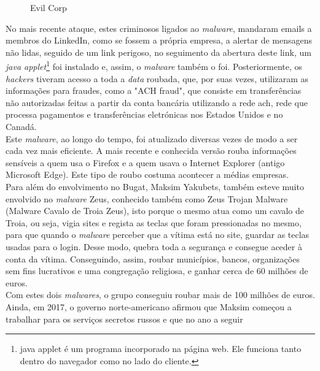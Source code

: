 \documentclass{report}
\begin{document}
\begin{figure}[h]
    \center
    \caption{Evil Corp}
    \label{evilcorp}
\end{figure}

No mais recente ataque, estes criminosos ligados ao \textit{malware}, mandaram emails a membros do LinkedIn, como se fossem a própria empresa, a alertar de mensagens não lidas, seguido de um link perigoso, no seguimento da abertura deste link, um \textit{java applet}\footnote{java applet é um programa incorporado na página web. Ele funciona tanto dentro do navegador como no lado do cliente.} foi instalado e, assim, o \textit{malware} também o foi. Posteriormente, os \textit{hackers} tiveram acesso a toda a \textit{data} roubada, que, por suas vezes, utilizaram as informações para fraudes, como a "ACH fraud", que consiste em transferências não autorizadas feitas a partir da conta bancária utilizando a rede \ac{ach}, rede que processa pagamentos e transferências eletrónicas nos Estados Unidos e no Canadá. \\ \indent Este \textit{malware}, ao longo do tempo, foi atualizado diversas vezes de modo a ser cada vez mais eficiente. A mais recente e conhecida versão rouba informações sensíveis a quem usa o Firefox e a quem usava o Internet Explorer (antigo Microsoft Edge). Este tipo de roubo costuma acontecer a médias empresas.\\ \indent Para além do envolvimento no Bugat, Maksim Yakubets, também esteve muito envolvido no \textit{malware} Zeus, conhecido também como Zeus Trojan Malware (Malware Cavalo de Troia Zeus), isto porque o mesmo atua como um cavalo de Troia, ou seja, vigia sites e regista as teclas que foram pressionadas no mesmo, para que quando o \textit{malware} perceber que a vítima está no site, guardar as teclas usadas para o login. Desse modo, quebra toda a segurança e consegue aceder à conta da vítima. Conseguindo, assim, roubar municípios, bancos, organizações sem fins lucrativos e uma congregação religiosa, e ganhar cerca de 60 milhões de euros. \cite{osmaisprocurados}  \\ \indent Com estes dois \textit{malwares}, o grupo conseguiu roubar mais de 100 milhões de euros.\\ \indent Ainda, em 2017, o governo norte-americano afirmou que Maksim começou a trabalhar para os serviços secretos russos e que no ano a seguir 
\end{document}
